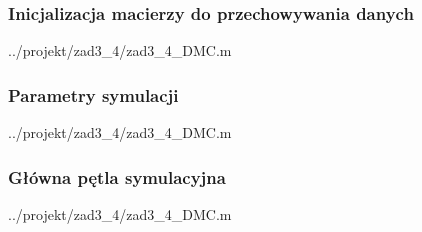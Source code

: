 \subsubsection{Inicjalizacja macierzy do przechowywania danych}

\ifdefined\CompileListings
    
        {../projekt/zad3_4/zad3_4_DMC.m}
\fi

\subsubsection{Parametry symulacji}

\ifdefined\CompileListings
    
        {../projekt/zad3_4/zad3_4_DMC.m}
    \newpage
\fi

\subsubsection{Główna pętla symulacyjna}

\ifdefined\CompileListings
    
        {../projekt/zad3_4/zad3_4_DMC.m}
\fi


\newpage
